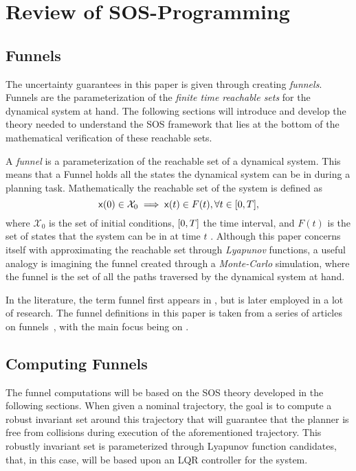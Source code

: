 \section{Review of SOS-Programming}

\subsection{Funnels}
\label{sec:funnels}

The uncertainty guarantees in this paper is given through creating
\textit{funnels}. Funnels are the parameterization of the \textit{finite time
  reachable sets} for the dynamical system at hand. The following sections will
introduce and develop the theory needed to understand the \ac{SOS} framework
that lies at the bottom of the mathematical verification of these reachable
sets. 

A \textit{funnel} is a parameterization of the reachable set of a dynamical
system. This means that a Funnel holds all the states the dynamical system can
be in during a planning task. Mathematically the reachable set of the system is
defined as
\[
  {\mathbf{\mathsf{x}}}(0) \in \mathcal{X}_0 \implies {\mathbf{\mathsf{x}}}(t) \in F(t), \forall t \in
  \lbrack0,T\rbrack,
\]
where \(\mathcal{X}_0\) is the set of initial conditions, \(\lbrack0,T\rbrack\) the time
interval, and \(F(t)\) is the set of states that the system can be in at time
\(t\) \cite{majumdarFunnelLibrariesRealtime2017}. Although this paper concerns
itself with approximating the reachable set through \textit{Lyapunov} functions,
a useful analogy is imagining the funnel created through a \textit{Monte-Carlo}
simulation, where the funnel is the set of all the paths traversed by the
dynamical system at hand.

In the literature, the term funnel first appears in
\cite{masonMechanicsManipulation1985}, but is later employed in a lot of
research. The funnel definitions in this paper is taken from a series of
articles on funnels~\cite{Tobenkin_2011,tedrakeLQRtreesFeedbackMotion2009,
  majumdarRobustOnlineMotion2013,
  majumdarFunnelLibrariesRealtime2017,ahmadi2014dsos}, with the main focus being
on \cite{majumdarFunnelLibrariesRealtime2017}.


\subsection{Computing Funnels}

The funnel computations will be based on the \ac{SOS} theory developed in the
following sections. When given a nominal trajectory, the goal is to compute a
robust invariant set around this trajectory that will guarantee that the planner
is free from collisions during execution of the aforementioned trajectory. This
robustly invariant set is parameterized through Lyapunov function candidates,
that, in this case, will be based upon an \ac{LQR} controller for the system.

